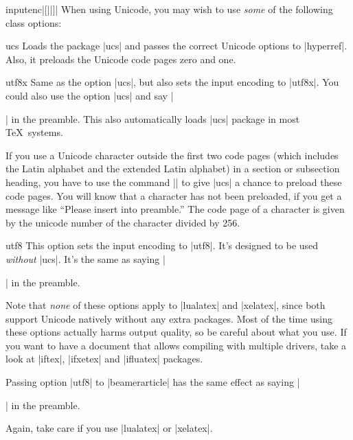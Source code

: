\begin{package}{{inputenc}|[||]|}
  \beamernote
  When using Unicode, you may wish to use \emph{some} of the following class options:
  \begin{classoption}{ucs}
    Loads the package |ucs| and passes the correct Unicode options to |hyperref|. Also, it preloads the Unicode code pages zero and one.
  \end{classoption}

  \begin{classoption}{utf8x}
    Same as the option |ucs|, but also sets the input encoding to |utf8x|. You could also use the option |ucs| and say |\usepackage[utf8x]{inputenc}| in the preamble. This also automatically loads |ucs| package in most \TeX\ systems.
  \end{classoption}

  If you use a Unicode character outside the first two code pages (which includes the Latin alphabet and the extended Latin alphabet) in a section or subsection heading, you have to use the command || to give |ucs| a chance to preload these code pages. You will know that a character has not been preloaded, if you get a message like ``Please insert into preamble.'' The code page of a character is given by the unicode number of the character divided by 256.

  \begin{classoption}{utf8}
    This option sets the input encoding to |utf8|. It's designed to be used \emph{without} |ucs|. It's the same as saying |\usepackage[utf8]{inputenc}| in the preamble.
  \end{classoption}

  Note that \emph{none} of these options apply to |lualatex| and |xelatex|, since both support Unicode natively without any extra packages. Most of the time using these options actually harms output quality, so be careful about what you use. If you want to have a document that allows compiling with multiple drivers, take a look at |iftex|, |ifxetex| and |ifluatex| packages.

  \articlenote
  Passing option |utf8| to |beamerarticle| has the same effect as saying |\usepackage[utf8]{inputenc}| in the preamble.

  Again, take care if you use |lualatex| or |xelatex|.
\end{package}

